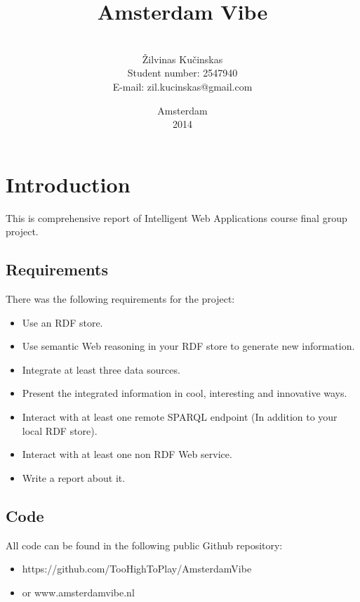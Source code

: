 \documentclass[12pt, a4paper, lithuanian]{article}
\title{Amsterdam Vibe}
\author{
    \\
    Žilvinas Kučinskas \\
    Student number: 2547940 \\
    E-mail: zil.kucinskas@gmail.com
}
\date{Amsterdam \\ 2014}
\begin{document}
\maketitle

\tableofcontents

\section{Introduction}

This is comprehensive report of Intelligent Web Applications course final group project.

\subsection{Requirements}

There was the following requirements for the project:

\begin{itemize}
    \item Use an RDF store.

    \item Use semantic Web reasoning in your RDF store to generate new information.

    \item Integrate at least three data sources.

    \item Present the integrated information in cool, interesting and innovative ways.

    \item Interact with at least one remote SPARQL endpoint (In addition to your local RDF store).

    \item Interact with at least one non RDF Web service.

    \item Write a report about it.

\end{itemize}


\subsection{Code}

All code can be found in the following public Github repository:

\begin{itemize}

  \item https://github.com/TooHighToPlay/AmsterdamVibe

  \item or www.amsterdamvibe.nl

\end{itemize}
\end{document}
